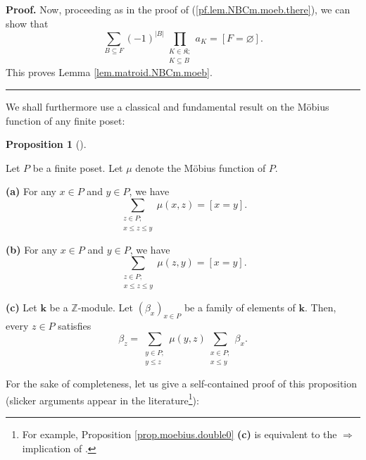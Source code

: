\documentclass[numbers=enddot,12pt,final,onecolumn,notitlepage]{scrartcl}%
\theoremstyle{definition}
\newtheorem{prop}[theo]{Proposition}
\newenvironment{proposition}[1][]
{\begin{prop}[#1]\begin{leftbar}}
{\end{leftbar}\end{prop}}
\newenvironment{proof}[1][Proof]{\noindent\textbf{#1.} }{\ \rule{0.5em}{0.5em}}
\let\sumnonlimits\sum
\let\prodnonlimits\prod
\renewcommand{\sum}{\sumnonlimits\limits}
\renewcommand{\prod}{\prodnonlimits\limits}
\begin{document}
\begin{proof}
Now, proceeding as in the proof of (\ref{pf.lem.NBCm.moeb.there}), we can show
that%
\[
\sum_{B\subseteq F}\left(  -1\right)  ^{\left\vert B\right\vert }%
\prod_{\substack{K\in\mathfrak{K};\\K\subseteq B}}a_{K}=\left[  F=\varnothing
\right]  .
\]
This proves Lemma \ref{lem.matroid.NBCm.moeb}.
\end{proof}

We shall furthermore use a classical and fundamental result on the M\"{o}bius
function of any finite poset:

\begin{proposition}
\label{prop.moebius.double0}Let $P$ be a finite poset. Let $\mu$ denote the
M\"{o}bius function of $P$.

\textbf{(a)} For any $x\in P$ and $y\in P$, we have%
\begin{equation}
\sum_{\substack{z\in P;\\x\leq z\leq y}}\mu\left(  x,z\right)  =\left[
x=y\right]  . \label{eq.prop.moebius.double0.a}%
\end{equation}


\textbf{(b)} For any $x\in P$ and $y\in P$, we have%
\begin{equation}
\sum_{\substack{z\in P;\\x\leq z\leq y}}\mu\left(  z,y\right)  =\left[
x=y\right]  . \label{eq.prop.moebius.double0.b}%
\end{equation}


\textbf{(c)} Let $\mathbf{k}$ be a $\mathbb{Z}$-module. Let $\left(  \beta
_{x}\right)  _{x\in P}$ be a family of elements of $\mathbf{k}$. Then, every
$z\in P$ satisfies%
\[
\beta_{z}=\sum_{\substack{y\in P;\\y\leq z}}\mu\left(  y,z\right)
\sum_{\substack{x\in P;\\x\leq y}}\beta_{x}.
\]

\end{proposition}

For the sake of completeness, let us give a self-contained proof of this
proposition (slicker arguments appear in the literature\footnote{For example,
Proposition \ref{prop.moebius.double0} \textbf{(c)} is equivalent to the
$\Longrightarrow$ implication of \cite[(5.1a)]{Martin15}.}):
\end{document}
